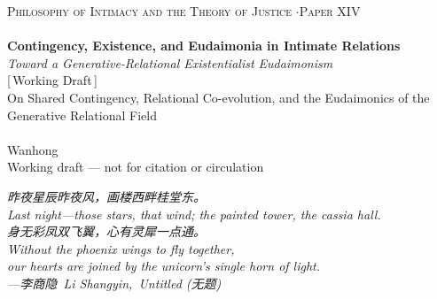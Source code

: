 \documentclass[11pt,a4paper]{article}
\newcommand{\zh}[1]{{\cjk #1}}
\begin{document}
\thispagestyle{empty}
\begin{center}
\vspace*{2cm}
{\footnotesize\color{rosedeep}\scshape Philosophy of Intimacy and the Theory of Justice \quad$\cdot$\quad Paper XIV}\\[0.3cm]
\coverrule\\[1.2cm]
{\LARGE\bfseries\color{warnred} Contingency, Existence, and Eudaimonia in Intimate Relations}\\[0.8cm]
{\large\itshape\color{warnred} Toward a Generative-Relational Existentialist Eudaimonism}\\[0.8cm]
{\small\color{gold} [\,Working Draft\,]}\\[0.8cm]
{\normalsize\color{inksoft} On Shared Contingency, Relational Co-evolution, and the Eudaimonics of the Generative Relational Field}\\[2cm]
\coverrule[0.25]\\[0.6cm]
{\normalsize\color{inksoft} Wanhong}\\
\vfill
{\footnotesize\color{gold} Working draft --- not for citation or circulation}
\coverfootnote
\end{center}
\newpage

\thispagestyle{empty}
\vspace*{2.4cm}
\begin{center}
\begin{minipage}{0.74\linewidth}
\centering\itshape\color{rose}
{\cjk 昨夜星辰昨夜风，画楼西畔桂堂东。}\\[0.3em]
Last night---those stars, that wind; the painted tower, the cassia hall.\\[0.8em]
{\cjk 身无彩凤双飞翼，心有灵犀一点通。}\\[0.3em]
Without the phoenix wings to fly together,\\
our hearts are joined by the unicorn's single horn of light.\\[0.6em]
{\upshape\footnotesize\color{gold} ---{\cjk 李商隐}\ Li Shangyin,\ \emph{Untitled} (\zh{无题})}
\end{minipage}
\end{center}
\newpage
\end{document}
